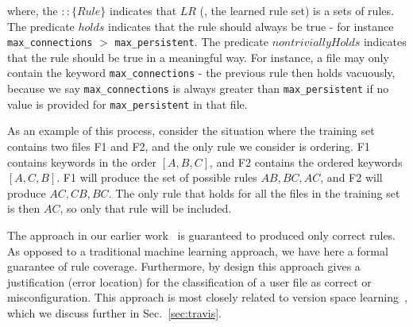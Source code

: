 where, the $:: \{Rule\}$ indicates that $LR$ (\ie, the learned rule set) 
is a sets of rules.
The predicate $holds$ indicates that the rule should always be true -
  for instance {\tt max\_connections} $>$ {\tt max\_persistent}.
The predicate $nontriviallyHolds$ indicates that the rule should be true in a meaningful way.
For instance, a file may only contain the keyword {\tt max\_connections} - the previous rule then holds vacuously,
 because we say {\tt max\_connections} is always greater than {\tt max\_persistent} if no value is provided for {\tt max\_persistent} in that file.


As an example of this process, consider the situation 
where the training set contains two files F1 and F2, 
and the only rule we consider is ordering.
F1 contains keywords in the order $[A,B,C]$, 
and F2 contains the ordered keywords $[A,C,B]$.
F1 will produce the set of possible rules $AB, BC, AC$, 
and F2 will produce $AC, CB, BC$.
The only rule that holds for all the files in the training set is 
then $AC$, so only that rule will be included.


\fi

The approach in our earlier work~\cite{santolucitoCAV} is guaranteed to produced only correct rules.
As opposed to a traditional machine learning approach, we have here a formal guarantee of rule coverage.
Furthermore, by design this approach gives a justification (error location) for the classification of a user file as correct or misconfiguration.
This approach is most closely related to version space learning~\cite{mitchell77}, which we discuss further in Sec.~\ref{sec:travis}.



